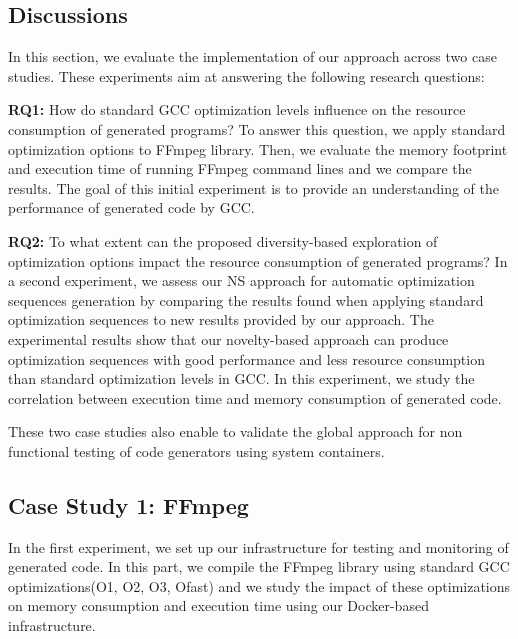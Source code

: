 
\subsection{Discussions}
\iffalse
In this section, we evaluate the implementation of our approach across two case studies. These experiments aim at answering the following research questions:

\textbf{RQ1:} How do standard GCC optimization levels influence on the resource consumption of generated programs?
To answer this question, we apply standard optimization options to FFmpeg library. Then, we evaluate the memory footprint and execution time of running FFmpeg command lines and we compare the results. The goal of this initial experiment is to
provide an understanding of the performance of generated code by GCC.

\textbf{RQ2:} To what extent can the proposed diversity-based exploration of optimization options impact the resource consumption of generated programs?
In a second experiment, we assess our NS approach for automatic optimization sequences generation by comparing the results found when applying standard optimization sequences to new results provided by our approach. The experimental results show that our novelty-based approach can produce optimization sequences with good performance and less resource consumption
than standard optimization levels in GCC. In this experiment, we study the correlation between execution time and memory consumption of generated code.

These two case studies  also enable to validate the global approach for non functional testing of code generators using system containers. 



\subsection{Case Study 1: FFmpeg}
In the first experiment, we set up our infrastructure for testing and monitoring of generated code. In this part, we compile the FFmpeg library using standard GCC optimizations(O1, O2, O3, Ofast) and we study the impact of these optimizations on memory consumption and execution time using our Docker-based infrastructure.

